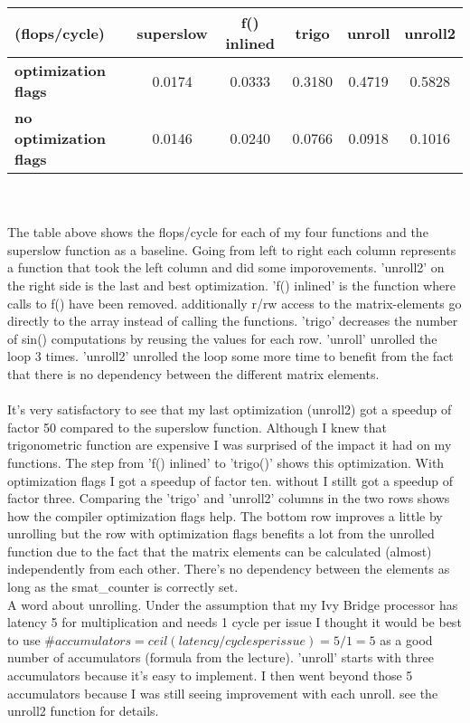 \documentclass[10pt,a4paper,oneside,notitlepage]{report}
\begin{document}
\begin{tabular}{|l|c|c|c|c|c|}
\hline 
\rowcolor{gray!30} 
 (flops/cycle) & \textbf{superslow} & \textbf{f() inlined} & \textbf{trigo} & \textbf{unroll} & \textbf{unroll2} \\ 
\hline 
\cellcolor{gray!30} \textbf{optimization flags} & 0.0174 & 0.0333 & 0.3180 & 0.4719 & 0.5828 \\ 
\hline 
\cellcolor{gray!30} \textbf{no optimization flags} & 0.0146 & 0.0240 & 0.0766 & 0.0918 & 0.1016 \\ 
\hline 
\end{tabular}  \\ \\
The table above shows the flops/cycle for each of my four functions and the superslow function as a baseline. Going from left to right each column represents a function that took the left column and did some imporovements. 'unroll2' on the right side is the last and best optimization. 'f() inlined' is the function where calls to f() have been removed. additionally r/rw access to the matrix-elements go directly to the array instead of calling the functions. 'trigo' decreases the number of sin() computations by reusing the values for each row. 'unroll' unrolled the loop 3 times. 'unroll2' unrolled the loop some more time to benefit from the fact that there is no dependency between the different matrix elements.
\\ \\
It's very satisfactory to see that my last optimization (unroll2) got a speedup of factor 50 compared to the superslow function. Although I knew that trigonometric function are expensive I was surprised of the impact it had on my functions.  The step from 'f() inlined' to 'trigo()' shows this optimization. With optimization flags I got a speedup of factor ten. without I stillt got a speedup of factor three. Comparing the 'trigo' and 'unroll2' columns in the two rows shows how the compiler optimization flags help. The bottom row improves a little by unrolling but the row with optimization flags benefits a lot from the unrolled function due to the fact that the matrix elements can be calculated  (almost) independently from each other. There's no dependency between the elements as long as the  smat\_counter is correctly set. \\

A word about unrolling. Under the assumption that my Ivy Bridge processor has latency 5 for multiplication and needs 1 cycle per issue I thought it would be best to use $\#accumulators = ceil(latency/cycles per issue) = 5 / 1 = 5$ as a good number of accumulators (formula from the lecture). 'unroll' starts with three accumulators because it's easy to implement. I then went beyond those 5 accumulators because I was still seeing improvement with each unroll. see the unroll2 function for details.
\end{document}
